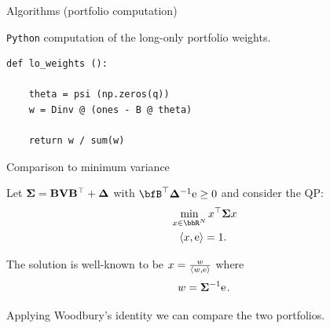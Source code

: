 \documentclass[11pt,leqno]{beamer}
\begin{document}
\begin{frame}[fragile]{Algorithms (portfolio computation)}

\verb|Python| computation of the long-only portfolio weights.

\begin{verbatim}
def lo_weights ():

    theta = psi (np.zeros(q))
    w = Dinv @ (ones - B @ theta) 
    
    return w / sum(w)

\end{verbatim}

\end{frame}




\begin{frame}{Comparison to minimum variance}

Let $\bm{\Sigma} = \mathbf{B} \mathbf{V} \mathbf{B}^\top + \bm{\Delta}$ with
$\bfB^\top \bdel^{-1} \rme \ge 0$
and consider the QP:
\begin{equation} \label{lomin}
 \begin{aligned}  
&\min_{x \in \bbR^{\nv}} x^\top \bsig x
  \\ &\hspace{8pt} \prj{x}{\rme} = 1 .
\end{aligned}
\end{equation}

The solution is well-known to be $x = \frac{w}{\langle w, \mathrm{e} \rangle}$
where 
\begin{align}
   w = \bsig^{-1} \rme \s . %
\end{align}

Applying Woodbury's identity we can compare the two
portfolios.


\end{frame}
\end{document}

